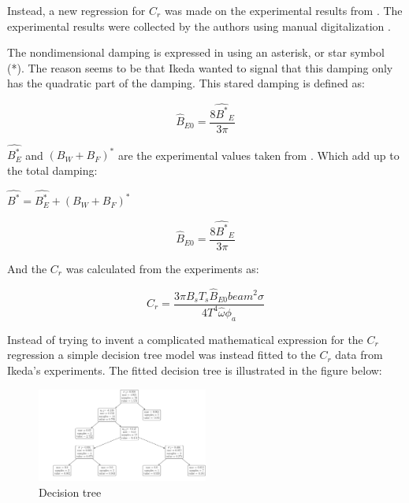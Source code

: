 Instead, a new regression for $C_r$ was made on the experimental
results from \cite{7505983/4AFVVGNT}. The experimental results were
collected by the authors using manual digitalization
\cite{7505983/RXYIE6UW}.

    The nondimensional damping is expressed in \cite{7505983/4AFVVGNT} using
an asterisk, or star symbol (*). The reason seems to be that Ikeda
wanted to signal that this damping only has the quadratic part of the
damping. This stared damping is defined as:
 
            
    
    \begin{equation}
\hat{B}_{E0} = \frac{8 \hat{B^*}_{E}}{3 \pi}
\label{eq:equation}
\end{equation}

    

    $\hat{B_E^*}$ and $(B_W+B_F)^*$ are the experimental values taken
from \cite{7505983/4AFVVGNT}. Which add up to the total damping:

    $\hat{B^*} = \hat{B^*_E} + (B_W+B_F)^*$
 
            
    
    \begin{equation}
\hat{B}_{E0} = \frac{8 \hat{B^*}_{E}}{3 \pi}
\label{eq:equation}
\end{equation}

    

    And the $C_r$ was calculated from the experiments as:
 
            
    
    \begin{equation}
C_{r} = \frac{3 \pi B_{s} T_{s} \hat{B}_{E0} beam^{2} \sigma}{4 T^{4} \hat{\omega} \phi_{a}}
\label{eq:equation}
\end{equation}

    

    Instead of trying to invent a complicated mathematical expression for
the $C_r$ regression a simple decision tree model was instead fitted
to the $C_r$ data from Ikeda's experiments. The fitted decision tree
is illustrated in the figure below:

    \begin{figure}[H]
        \begin{center}\includegraphics[width = 0.5\textwidth]{figures/decision_tree.pdf}\end{center}
        \vspace{-1cm}
        \caption{Decision tree}
        \label{fig:decision_tree}
    \end{figure}
    
